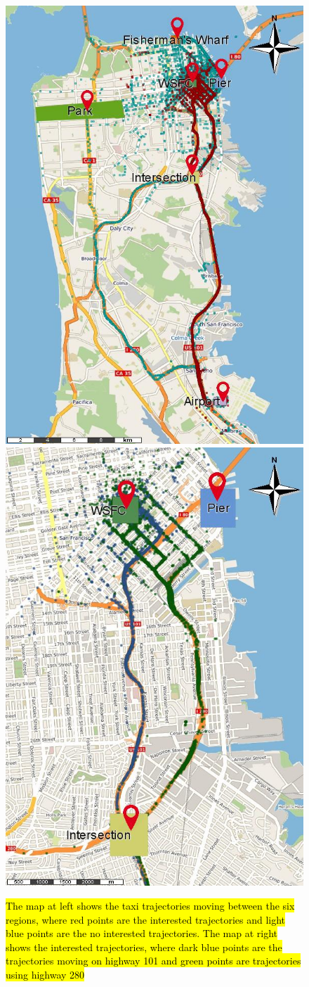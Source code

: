 \documentclass[12pt]{article}
\begin{document}
\begin{figure}[ht!]
\centering
\includegraphics[width=.45\textwidth]{Images/new_CRAWDAD-Trajectories-Painted}
\includegraphics[width=.45\textwidth]{Images/new_CRAWDAD-Paths-Painted}
\caption{\hl{The map at left shows the taxi trajectories moving between the six regions, where red points are the interested trajectories and light blue points are the no interested trajectories. The map at right shows the interested trajectories, where dark blue points are the trajectories moving on highway 101 and green points are trajectories using highway 280}}
\label{fig:new_sanfrancisco_map_rois}
\end{figure}
\end{document}
